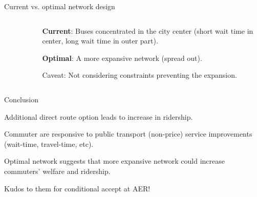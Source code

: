 \documentclass[notes,11pt, aspectratio=169]{beamer}
\newenvironment{wideitemize}{\itemize\addtolength{\itemsep}{0.4em}}{\enditemize}
\begin{document}
\begin{frame}{Current vs. optimal network design}
	\begin{columns}
	\begin{column}{0.6\textwidth}
	\begin{figure}
	\end{figure}
\end{column}
\begin{column}{0.4\textwidth}
	\begin{wideitemize}
	\item \textbf{Current}: Buses concentrated in the city center (short wait time in center, long wait time in outer part).
	\item \textbf{Optimal}: A more expansive network (spread out).
	\item Caveat: Not considering constraints preventing the expansion.
	\end{wideitemize}	
\end{column}
\end{columns}
\end{frame}

\begin{frame}{Conclusion}
	\begin{wideitemize}
		\item Additional direct route option leads to increase in ridership.
		\item Commuter are responsive to public transport (non-price) service improvements (wait-time, travel-time, etc).
		\item Optimal network suggests that more expansive network could increase commuters' welfare and ridership. 
		\item Kudos to them for conditional accept at AER!
	\end{wideitemize}	
\end{frame}
\end{document}
